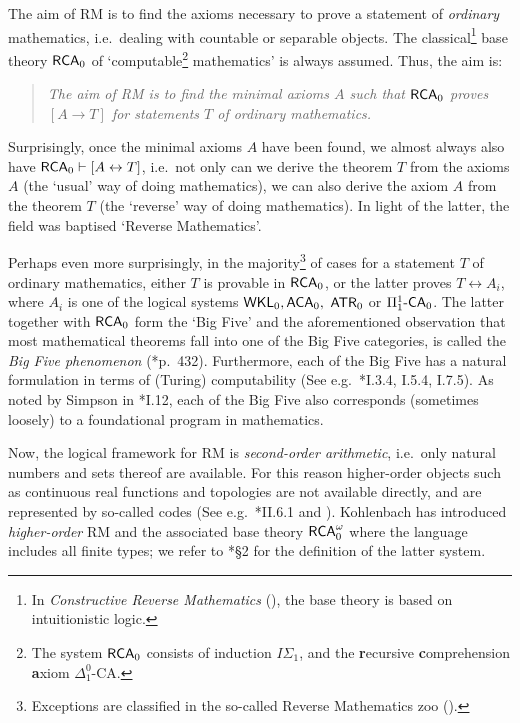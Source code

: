 \documentclass[reqno]{amsart}
\def\FIVE{\Pi_{1}^{1}\text{-\textsf{CA}}_{0}}
\def\ATR{\textup{\textsf{ATR}}}
\def\RCA{\textup{\textsf{RCA}}}
\def\RCAo{\textup{\textsf{RCA}}_{0}^{\omega}}
\def\WKL{\textup{\textsf{WKL}}}
\def\di{\rightarrow}
\def\asa{\leftrightarrow}
\def\ACA{\textup{\textsf{ACA}}}
\numberwithin{equation}{section}
\numberwithin{thm}{section}
\begin{document}
The aim of RM is to find the axioms necessary to prove a statement of \emph{ordinary} mathematics, i.e.\ dealing with countable or separable objects.   
The classical\footnote{In \emph{Constructive Reverse Mathematics} (\cite{ishi1}), the base theory is based on intuitionistic logic.} base theory $\RCA_{0}$ of `computable\footnote{The system $\RCA_{0}$ consists of induction $I\Sigma_{1}$, and the {\bf r}ecursive {\bf c}omprehension {\bf a}xiom $\Delta_{1}^{0}$-CA.} mathematics' is always assumed.  
Thus, the aim is:  
\begin{quote}
\emph{The aim of \emph{RM} is to find the minimal axioms $A$ such that $\RCA_{0}$ proves $ [A\di T]$ for statements $T$ of ordinary mathematics.}
\end{quote}
Surprisingly, once the minimal axioms $A$ have been found, we almost always also have $\RCA_{0}\vdash [A\asa T]$, i.e.\ not only can we derive the theorem $T$ from the axioms $A$ (the `usual' way of doing mathematics), we can also derive the axiom $A$ from the theorem $T$ (the `reverse' way of doing mathematics).  In light of the latter, the field was baptised `Reverse Mathematics'.    

\medskip

Perhaps even more surprisingly, in the majority\footnote{Exceptions are classified in the so-called Reverse Mathematics zoo (\cite{damirzoo}).
} 
of cases for a statement $T$ of ordinary mathematics, either $T$ is provable in $\RCA_{0}$, or the latter proves $T\asa A_{i}$, where $A_{i}$ is one of the logical systems $\WKL_{0}, \ACA_{0},$ $ \ATR_{0}$ or $\FIVE$.  The latter together with $\RCA_{0}$ form the `Big Five' and the aforementioned observation that most mathematical theorems fall into one of the Big Five categories, is called the \emph{Big Five phenomenon} (\cite{montahue}*{p.~432}).  
Furthermore, each of the Big Five has a natural formulation in terms of (Turing) computability (See e.g.\ \cite{simpson2}*{I.3.4, I.5.4, I.7.5}).
As noted by Simpson in \cite{simpson2}*{I.12}, each of the Big Five also corresponds (sometimes loosely) to a foundational program in mathematics.  

\medskip

Now, the logical framework for RM is \emph{second-order arithmetic}, i.e.\ only natural numbers and sets thereof are available.  
For this reason higher-order objects such as continuous real functions and topologies are not available directly, and are represented by so-called codes (See e.g.\ \cite{simpson2}*{II.6.1} and \cite{mummy}).  Kohlenbach has introduced \emph{higher-order} RM and the associated base theory $\RCAo$ where the language includes all finite types; we refer to \cite{kohlenbach2}*{\S2} for the definition of the latter system.  
\end{document}
